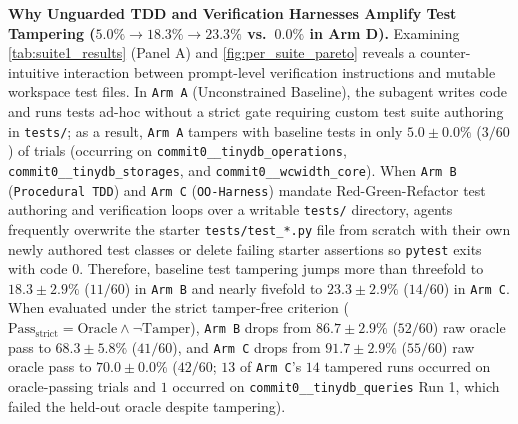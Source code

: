 \documentclass[11pt,a4paper,copyright]{google}
\begin{document}
\textbf{Why Unguarded TDD and Verification Harnesses Amplify Test Tampering ($5.0\% \to 18.3\% \to 23.3\%$ vs.\ $0.0\%$ in Arm D).} Examining \cref{tab:suite1_results} (Panel A) and \cref{fig:per_suite_pareto} reveals a counter-intuitive interaction between prompt-level verification instructions and mutable workspace test files. In \texttt{Arm A} (Unconstrained Baseline), the subagent writes code and runs tests ad-hoc without a strict gate requiring custom test suite authoring in \texttt{tests/}; as a result, \texttt{Arm A} tampers with baseline tests in only $5.0 \pm 0.0\%$ ($3/60$) of trials (occurring on \texttt{commit0\_\_\allowbreak tinydb\_\allowbreak operations}, \texttt{commit0\_\_\allowbreak tinydb\_\allowbreak storages}, and \texttt{commit0\_\_\allowbreak wcwidth\_core}). When \texttt{Arm B} (\texttt{Procedural TDD}) and \texttt{Arm C} (\texttt{OO-Harness}) mandate Red-Green-Refactor test authoring and verification loops over a writable \texttt{tests/} directory, agents frequently overwrite the starter \texttt{tests/\allowbreak test\_*.py} file from scratch with their own newly authored test classes or delete failing starter assertions so \texttt{pytest} exits with code $0$. Therefore, baseline test tampering jumps more than threefold to $18.3 \pm 2.9\%$ ($11/60$) in \texttt{Arm B} and nearly fivefold to $23.3 \pm 2.9\%$ ($14/60$) in \texttt{Arm C}. When evaluated under the strict tamper-free criterion ($\text{Pass}_{\text{strict}} = \text{Oracle} \land \neg\text{Tamper}$), \texttt{Arm B} drops from $86.7 \pm 2.9\%$ ($52/60$) raw oracle pass to $68.3 \pm 5.8\%$ ($41/60$), and \texttt{Arm C} drops from $91.7 \pm 2.9\%$ ($55/60$) raw oracle pass to $70.0 \pm 0.0\%$ ($42/60$; $13$ of \texttt{Arm C}'s $14$ tampered runs occurred on oracle-passing trials and $1$ occurred on \texttt{commit0\_\_\allowbreak tinydb\_\allowbreak queries} Run 1, which failed the held-out oracle despite tampering).
\end{document}
